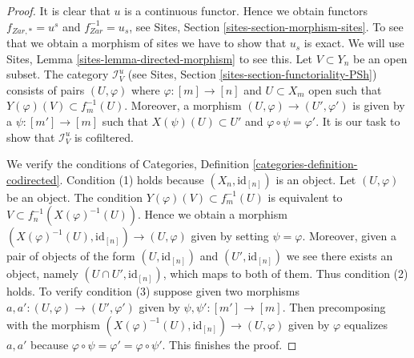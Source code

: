 \documentclass{stacks-project}
\theoremstyle{plain}
\theoremstyle{definition}
\theoremstyle{remark}
\numberwithin{equation}{subsection}
\begin{document}
\begin{proof}
It is clear that $u$ is a continuous functor. Hence we obtain functors
$f_{Zar, *} = u^s$ and $f_{Zar}^{-1} = u_s$, see
Sites, Section \ref{sites-section-morphism-sites}.
To see that we obtain a morphism of sites we have to show
that $u_s$ is exact. We will use
Sites, Lemma \ref{sites-lemma-directed-morphism} to see this.
Let $V \subset Y_n$ be an open subset. The category
$\mathcal{I}_V^u$ (see Sites, Section \ref{sites-section-functoriality-PSh})
consists of pairs $(U, \varphi)$ where
$\varphi : [m] \to [n]$ and $U \subset X_m$ open such that
$Y(\varphi)(V) \subset f_m^{-1}(U)$. Moreover, a morphism
$(U, \varphi) \to (U', \varphi')$ is given by a
$\psi : [m'] \to [m]$ such that $X(\psi)(U) \subset U'$
and $\varphi \circ \psi = \varphi'$.
It is our task to show that $\mathcal{I}_V^u$ is cofiltered.

\medskip\noindent
We verify the conditions of
Categories, Definition \ref{categories-definition-codirected}.
Condition (1) holds because $(X_n, \text{id}_{[n]})$ is an object.
Let $(U, \varphi)$ be an object. The condition
$Y(\varphi)(V) \subset f_m^{-1}(U)$ is equivalent to
$V \subset f_n^{-1}(X(\varphi)^{-1}(U))$. Hence we obtain a morphism
$(X(\varphi)^{-1}(U), \text{id}_{[n]}) \to (U, \varphi)$ given
by setting $\psi = \varphi$. Moreover, given a pair of objects
of the form $(U, \text{id}_{[n]})$ and $(U', \text{id}_{[n]})$
we see there exists an object, namely $(U \cap U', \text{id}_{[n]})$,
which maps to both of them. Thus condition (2) holds.
To verify condition (3) suppose given two morphisms
$a, a': (U, \varphi) \to (U', \varphi')$ given by $\psi, \psi' : [m'] \to [m]$.
Then precomposing with the morphism
$(X(\varphi)^{-1}(U), \text{id}_{[n]}) \to (U, \varphi)$ given
by $\varphi$ equalizes $a, a'$ because
$\varphi \circ \psi = \varphi' = \varphi \circ \psi'$.
This finishes the proof.
\end{proof}
\end{document}
